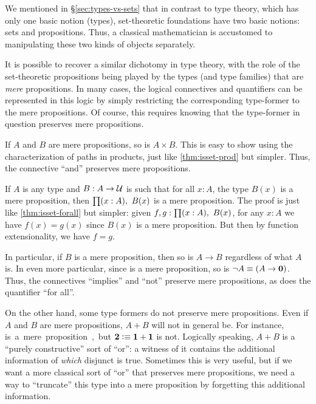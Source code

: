 We mentioned in \S\ref{sec:types-vs-sets} that in contrast to type theory, which has only one basic notion (types), set-theoretic foundations have two basic notions: sets and propositions.
Thus, a classical mathematician is accustomed to manipulating these two kinds of objects separately.

It is possible to recover a similar dichotomy in type theory, with the role of the set-theoretic propositions being played by the types (and type families) that are \emph{mere} propositions.
In many cases, the logical connectives and quantifiers can be represented in this logic by simply restricting the corresponding type-former to the mere propositions.
Of course, this requires knowing that the type-former in question preserves mere propositions.

\begin{eg}
  If $A$ and $B$ are mere propositions, so is $A\times B$.
  This is easy to show using the characterization of paths in products, just like \autoref{thm:isset-prod} but simpler.
  Thus, the connective ``and'' preserves mere propositions.
\end{eg}

\begin{eg}\label{thm:isprop-forall}
  If $A$ is any type and $B:A\to \mathcal{U}$ is such that for all $x:A$, the type $B(x)$ is a mere proposition, then $\prd{x:A} B(x)$ is a mere proposition.
  The proof is just like \autoref{thm:isset-forall} but simpler: given $f,g:\prd{x:A} B(x)$, for any $x:A$ we have $f(x)=g(x)$ since $B(x)$ is a mere proposition.
  But then by function extensionality, we have $f=g$.

  In particular, if $B$ is a mere proposition, then so is $A\to B$ regardless of what $A$ is.
  In even more particular, since \emptyt is a mere proposition, so is $\neg A \equiv (A\to\mathbf{0})$.
  Thus, the connectives ``implies'' and ``not'' preserve mere propositions, as does the quantifier ``for all''.
\end{eg}

On the other hand, some type formers do not preserve mere propositions.
Even if $A$ and $B$ are mere propositions, $A+B$ will not in general be.
For instance, \unit is a mere proposition, but $\mathbf{2}\vcentcolon\equiv\mathbf{1}+\mathbf{1}$ is not.
Logically speaking, $A+B$ is a ``purely constructive'' sort of ``or'': a witness of it contains the additional information of \emph{which} disjunct is true.
Sometimes this is very useful, but if we want a more classical sort of ``or'' that preserves mere propositions, we need a way to ``truncate'' this type into a mere proposition by forgetting this additional information.

